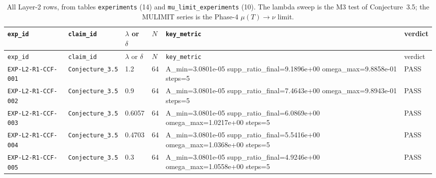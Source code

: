 {\scriptsize
\begin{longtable}{@{}>{\raggedright\arraybackslash}p{} >{\raggedright\arraybackslash}p{} l l >{\raggedright\arraybackslash}p{} l@{}}
\caption[Layer 2 experiments]{All Layer-2 rows, from tables \texttt{experiments} (14) and \texttt{mu\_limit\_experiments} (10). The lambda sweep is the M3 test of Conjecture~3.5; the MULIMIT series is the Phase-4 $\mu(T)\to\nu$ limit.}
\label{tab:a1-layer2}\\
\toprule
\texttt{exp\_id} & \texttt{claim\_id} & $\lambda$ or $\delta$ & $N$ & \texttt{key\_metric} & verdict\\
\midrule
\endfirsthead
\toprule
\texttt{exp\_id} & \texttt{claim\_id} & $\lambda$ or $\delta$ & $N$ & \texttt{key\_metric} & verdict\\
\midrule
\endhead
\bottomrule
\endfoot
\texttt{EXP-\allowbreak{}L2-\allowbreak{}R1-\allowbreak{}CCF-\allowbreak{}001} & \texttt{Conjecture\_\allowbreak{}3.5} & 1.2 & 64 & A\_\allowbreak{}min=\allowbreak{}3.0801e-05  supp\_\allowbreak{}ratio\_\allowbreak{}final=\allowbreak{}9.1896e+00  omega\_\allowbreak{}max=\allowbreak{}9.8858e-01  steps=\allowbreak{}5 & \textsf{PASS}\\
\texttt{EXP-\allowbreak{}L2-\allowbreak{}R1-\allowbreak{}CCF-\allowbreak{}002} & \texttt{Conjecture\_\allowbreak{}3.5} & 0.9 & 64 & A\_\allowbreak{}min=\allowbreak{}3.0801e-05  supp\_\allowbreak{}ratio\_\allowbreak{}final=\allowbreak{}7.4643e+00  omega\_\allowbreak{}max=\allowbreak{}9.8943e-01  steps=\allowbreak{}5 & \textsf{PASS}\\
\texttt{EXP-\allowbreak{}L2-\allowbreak{}R1-\allowbreak{}CCF-\allowbreak{}003} & \texttt{Conjecture\_\allowbreak{}3.5} & 0.6057 & 64 & A\_\allowbreak{}min=\allowbreak{}3.0801e-05  supp\_\allowbreak{}ratio\_\allowbreak{}final=\allowbreak{}6.0869e+00  omega\_\allowbreak{}max=\allowbreak{}1.0217e+00  steps=\allowbreak{}5 & \textsf{PASS}\\
\texttt{EXP-\allowbreak{}L2-\allowbreak{}R1-\allowbreak{}CCF-\allowbreak{}004} & \texttt{Conjecture\_\allowbreak{}3.5} & 0.4703 & 64 & A\_\allowbreak{}min=\allowbreak{}3.0801e-05  supp\_\allowbreak{}ratio\_\allowbreak{}final=\allowbreak{}5.5416e+00  omega\_\allowbreak{}max=\allowbreak{}1.0368e+00  steps=\allowbreak{}5 & \textsf{PASS}\\
\texttt{EXP-\allowbreak{}L2-\allowbreak{}R1-\allowbreak{}CCF-\allowbreak{}005} & \texttt{Conjecture\_\allowbreak{}3.5} & 0.3 & 64 & A\_\allowbreak{}min=\allowbreak{}3.0801e-05  supp\_\allowbreak{}ratio\_\allowbreak{}final=\allowbreak{}4.9246e+00  omega\_\allowbreak{}max=\allowbreak{}1.0558e+00  steps=\allowbreak{}5 & \textsf{PASS}\\

\end{longtable}}
